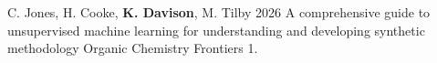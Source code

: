 \vspace{5mm}
\begin{cvpubys}
    \cvpuby
        {C. Jones, H. Cooke, \textbf{K. Davison}, M. Tilby}
        {2026}
        {A comprehensive guide to unsupervised machine learning for understanding and developing synthetic methodology}
        {Organic Chemistry Frontiers}
        {}
        {}
        {1.}
\end{cvpubys}